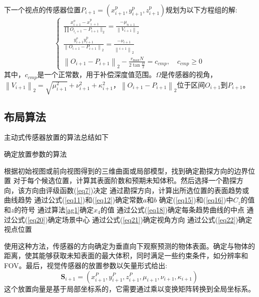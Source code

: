 \documentclass[AutoFakeBold,zihao=-4]{ctexart}
\begin{document}
	下一个视点的传感器位置$ P_{i+1}=\left(x_{i+1}^{\mathrm{p}}, y_{i+1}^{\mathrm{p}}, z_{i+1}^{\mathrm{p}}\right) $规划为以下方程组的解:
	\begin{equation}
		\left\{\begin{array}{l}
			\frac{x_{i+1}^{o}-x_{\imath+1}^{\mathrm{p}}}{\prod O_{i_{i}+1}-P_{i+1} \|_{2}}=\frac{-\mu_{n+1}}{\left\|V_{i+1}\right\|_{2}} \\
			\frac{y_{i+1}^{o} y_{i+1}^{\mathrm{p}}}{\left\|O_{i+1}-P_{i+1}\right\|_{2}}=\frac{-\nu_{i+1}}{\left\|_{i+1}\right\|_{2}} \\
			\left\|O_{i+1}-P_{i+1}\right\|_{2}-\frac{r_{\max } N}{2 \tan \frac{\Omega}{2}}=c_{c m p}, \quad c_{c m p} \geq 0
		\end{array}\right.
		\label{eq22}
	\end{equation}
	其中，$ c_{cmp} $是一个正常数，用于补偿深度值范围。$ \Omega $是传感器的视角，$ \left\|V_{i+1}\right\|_{2}=\sqrt{\mu_{i+1}^{2}}+\nu_{i+1}^{2}+\kappa_{i+1}^{2}$，$ \left\|O_{i+1}-P_{i+1}\right\|_{2} $位于区间$ O_{i+1} $到$ P_{i+1} $。
	
	\subsection{布局算法}
	主动式传感器放置的算法总结如下
	\begin{algorithm}
		\caption{确定放置参数的算法}
		\label{ag1}
		根据初始视图或前向视图得到的三维曲面或局部模型，找到确定勘探方向的边界位置\;
		对于每个候选位置，计算其表面阶数和预期未知体积。然后选择一个勘探方向，该方向由评级函数(\ref{eq7})决定\;
		通过勘探方向，计算出所选位置的表面趋势或曲线趋势\;
		通过公式(\ref{eq11})和(\ref{eq12})确定常数$ a $和$ b $\;
		确定(\ref{eq15})和(\ref{eq16})中$ C_{z} $的值和$ z $的符号\;
		通过算法\ref{ag1}确定$ x_{4} $的值\;
		通过公式(\ref{eq18})确定每条趋势曲线的中点\;
		通过公式(\ref{eq20})确定场景中心\;
		通过公式(\ref{eq21})确定视角方向\;
		通过公式(\ref{eq22})确定视点位置\;
	\end{algorithm}
	
	使用这种方法，传感器的方向确定为垂直向下观察预测的物体表面。确定与物体的距离，使其能够获取未知表面的最大体积，同时满足一些约束条件，如分辨率和FOV。最后，视觉传感器的放置参数以矢量形式给出:
	\begin{equation}
		\boldsymbol{S}_{i+1}=\left(x_{i+1}^{P}, y_{i+1}^{P}, z_{i+1}^{P}, \mu_{i+1}, \nu_{i+1}, \kappa_{i+1}\right)
		\label{eq23}
	\end{equation}
	这个放置向量是基于局部坐标系的，它需要通过乘以变换矩阵转换到全局坐标系。
	
\end{document}
